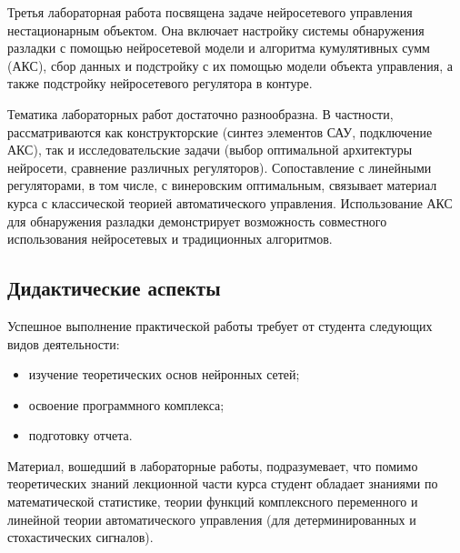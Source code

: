 Третья лабораторная работа посвящена задаче нейросетевого управления
нестационарным объектом.  Она включает настройку системы обнаружения
разладки с помощью нейросетевой модели и алгоритма кумулятивных сумм
(АКС), сбор данных и подстройку с их помощью модели объекта
управления, а также подстройку нейросетевого регулятора в контуре.

Тематика лабораторных работ достаточно разнообразна.  В частности,
рассматриваются как конструкторские (синтез элементов САУ, подключение
АКС), так и исследовательские задачи (выбор оптимальной архитектуры
нейросети, сравнение различных регуляторов).  Сопоставление с
линейными регуляторами, в том числе, с винеровским оптимальным,
связывает материал курса с классической теорией автоматического
управления.  Использование АКС для обнаружения разладки демонстрирует
возможность совместного использования нейросетевых и традиционных
алгоритмов.

\subsection{Дидактические аспекты}

Успешное выполнение практической работы требует от студента следующих
видов деятельности:

\begin{itemize}

\item изучение теоретических основ нейронных сетей;

\item освоение программного комплекса;

\item подготовку отчета.

\end{itemize}

Материал, вошедший в лабораторные работы, подразумевает, что помимо
теоретических знаний лекционной части курса студент обладает знаниями
по математической статистике, теории функций комплексного переменного
и линейной теории автоматического управления (для детерминированных и
стохастических сигналов).

